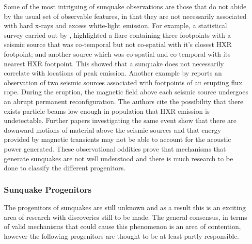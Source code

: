 Some of the most intriguing of sunquake observations are those that do not abide by the usual set of observable features, in that they are not necessarily associated with hard x-rays and excess white-light emission. For example, a statistical survey carried out by \cite{2012SoPh..277..317P}, highlighted a flare containing three footpoints with a seismic source that was co-temporal but not co-spatial with it's closest HXR footpoint; and another source which was co-spatial and co-temporal with its nearest HXR footpoint. This showed that a sunquake does not necessarily correlate with locations of peak emission. Another example by \cite{2011ApJ...741L..35Z} reports an observation of two seismic sources associated with footpoints of an erupting flux rope. During the eruption, the magnetic field above each seismic source undergoes an abrupt permanent reconfiguration. The authors cite the possibility that there exists particle beams low enough in population that HXR emission is undetectable. Further papers investigating the same event \citep{2013SoPh..284..315Z} show that there are downward motions of material above the seismic sources and that energy provided by magnetic transients may not be able to account for the acoustic power generated. These observational oddities prove that mechanisms that generate sunquakes are not well understood and there is much research to be done to classify the different progenitors.      

\subsubsection{Sunquake Progenitors}\label{sunprog}


The progenitors of sunquakes are still unknown and as a result this is an exciting area of research with discoveries still to be made. The general consensus, in terms of valid mechanisms that could cause this phenomenon is an area of contention, however the following progenitors are thought to be at least partly responsible. \\

